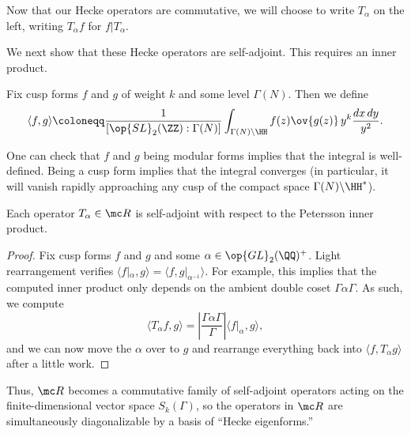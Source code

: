 \documentclass{article}
\begin{document}
\begin{notation}
	Now that our Hecke operators are commutative, we will choose to write $T_\alpha$ on the left, writing $T_\alpha f$ for $f|T_\alpha$.
\end{notation}
We next show that these Hecke operators are self-adjoint. This requires an inner product.
\begin{definition}
	Fix cusp forms $f$ and $g$ of weight $k$ and some level $\Gamma(N)$. Then we define
	\[\langle f,g\rangle\coloneqq\frac1{[\op{SL}_2(\ZZ):\Gamma(N)]}\int_{\Gamma(N)\backslash\HH}f(z)\ov{g(z)}\,y^k\frac{dx\,dy}{y^2}.\]
\end{definition}
One can check that $f$ and $g$ being modular forms implies that the integral is well-defined. Being a cusp form implies that the integral converges (in particular, it will vanish rapidly approaching any cusp of the compact space $\Gamma(N)\backslash\HH^*$).
\begin{proposition}
	Each operator $T_\alpha\in\mc R$ is self-adjoint with respect to the Petersson inner product.
\end{proposition}
\begin{proof}
	Fix cusp forms $f$ and $g$ and some $\alpha\in\op{GL}_2(\QQ)^+$. Light rearrangement verifies $\langle f|_\alpha,g\rangle=\langle f,g|_{\alpha^{-1}}\rangle$. For example, this implies that the computed inner product only depends on the ambient double coset $\Gamma\alpha\Gamma$. As such, we compute
	\[\langle T_\alpha f,g\rangle=\left|\frac{\Gamma\alpha\Gamma}{\Gamma}\right|\langle f|_\alpha,g\rangle,\]
	and we can now move the $\alpha$ over to $g$ and rearrange everything back into $\langle f,T_\alpha g\rangle$ after a little work.
\end{proof}
Thus, $\mc R$ becomes a commutative family of self-adjoint operators acting on the finite-dimensional vector space $S_k(\Gamma)$, so the operators in $\mc R$ are simultaneously diagonalizable by a basis of ``Hecke eigenforms.''
\end{document}
